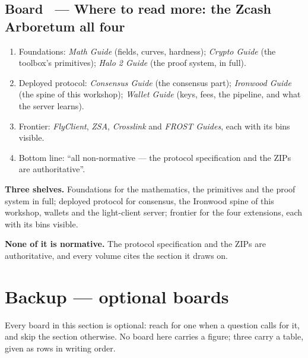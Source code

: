 \documentclass[11pt,a4paper]{article}
\makeatletter
\newcounter{board}
\newenvironment{board}[2]{\stepcounter{board}%
  \subsection*{Board \theboard\ --- #1 \hfill {\normalfont\small\color{arb}#2}}}{\medskip}
\newcommand{\Write}{\draw@head{Write}}
\newcommand{\Say}{\draw@head{Say}}
\makeatother
\begin{document}
\begin{board}{Where to read more: the Zcash Arboretum}{all four}
\Write
\begin{enumerate}
  \item Foundations: \emph{Math Guide} (fields, curves, hardness);
    \emph{Crypto Guide} (the toolbox's primitives); \emph{Halo 2 Guide}
    (the proof system, in full).
  \item Deployed protocol: \emph{Consensus Guide} (the consensus part);
    \emph{Ironwood Guide} (the spine of this workshop); \emph{Wallet
    Guide} (keys, fees, the pipeline, and what the server learns).
  \item Frontier: \emph{FlyClient}, \emph{ZSA}, \emph{Crosslink} and
    \emph{FROST Guides}, each with its bins visible.
  \item Bottom line: ``all non-normative --- the protocol specification
    and the ZIPs are authoritative''.
\end{enumerate}
\Say
\textbf{Three shelves.} Foundations for the mathematics, the primitives
and the proof system in full; deployed protocol for consensus, the
Ironwood spine of this workshop, wallets and the light-client server;
frontier for the four extensions, each with its bins visible.

\textbf{None of it is normative.} The protocol specification and the
ZIPs are authoritative, and every volume cites the section it draws on.
\end{board}

\section{Backup --- optional boards}

Every board in this section is optional: reach for one when a question
calls for it, and skip the section otherwise. No board here carries a
figure; three carry a table, given as rows in writing order.
\end{document}
